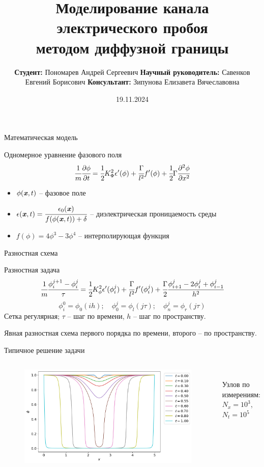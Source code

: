 \documentclass[aspectratio=169]{beamer}
\title[Электрический пробой]{Моделирование канала электрического пробоя \\ методом диффузной границы}
\author[]{
	\raggedright
	\hfill \break
	\hspace*{8cm}
	\textbf{Студент:} \linebreak
	\hspace*{8cm}
	\vspace{0.2cm}
	Пономарев Андрей Сергеевич \linebreak
	\hspace*{8cm}
	\textbf{Научный руководитель:} \linebreak
	\hspace*{8cm}
	\vspace{0.2cm}
	Савенков Евгений Борисович
	\hspace*{8cm}
	\textbf{Консультант:} \linebreak
	\hspace*{8cm}
	Зипунова Елизавета Вячеславовна
}
\date{19.11.2024}
\newcommand{\vect}[1]{\textbf{\textit{#1}}}
\newcommand{\vx}{{\vect{x}}}
\newcommand{\half}{\cfrac{1}{2}}
\newcommand{\partt}[1]{\cfrac{\partial #1}{\partial t}}
\newcommand{\partxx}[1]{\cfrac{\partial^2 #1}{\partial x^2}}
\begin{document}
\begin{frame}
\titlepage
\end{frame}


\begin{frame}{Математическая модель}
\begin{block}{Одномерное уравнение фазового поля}
	$$\cfrac{1}{m} \partt{\phi} = \half K_\Phi^2 \epsilon'(\phi) + \cfrac{\Gamma}{l^2} f'(\phi) + \half \Gamma \partxx{\phi}$$
\end{block}
\begin{itemize}
	\item $\phi(\vx, t)$ -- фазовое поле
	\item $\epsilon(\vx, t) = \cfrac{\epsilon_0(\vx)}{f(\phi(\vx, t)) + \delta}$ -- диэлектрическая проницаемость среды
	\item $f(\phi) = 4 \phi^3 - 3 \phi^4$ -- интерполирующая функция
\end{itemize}
\end{frame}


\begin{frame}{Разностная схема}
\begin{block}{Разностная задача}
	$$\cfrac{1}{m} \cfrac{\phi_i^{j + 1} - \phi_i^j}{\tau} = \half K_\phi^2 \epsilon'(\phi_i^j) + \cfrac{\Gamma}{l^2} f'(\phi_i^j) + \cfrac{\Gamma}{2} \cfrac{\phi_{i + 1}^j - 2 \phi_i^j + \phi_{i - 1}^j}{h^2}$$
	$$\phi_i^0 = \phi_0(ih); \quad \phi_0^j = \phi_l(j \tau); \quad \phi_n^j = \phi_r(j \tau)$$
	Сетка регулярная; $\tau$ -- шаг по времени, $h$ -- шаг по пространству.
\end{block}
Явная разностная схема первого порядка по времени, второго -- по пространству.
\end{frame}


\begin{frame}{Типичное решение задачи}
\vspace{-0.4cm}
\begin{columns}
	\begin{figure}
		\includegraphics[width=\textwidth]{figures/typical_solution.png}
	\end{figure}
	\hfill \\
	\vspace{3.5cm}
	\hspace{-2.5cm}
	Узлов по измерениям: \\
	\hspace{-2.5cm}
	$N_x = 10^3$, $N_t = 10^5$
\end{columns}
\end{frame}
\end{document}

